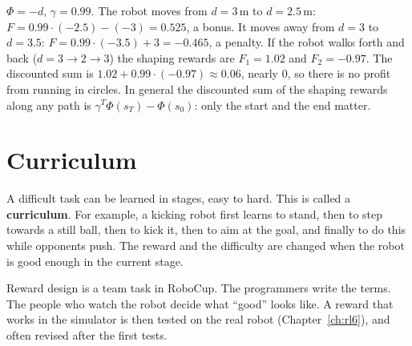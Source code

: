 \begin{example}
$\Phi=-d$, $\gamma=0.99$. The robot moves from $d=3$\,m to $d=2.5$\,m: $F=0.99\cdot(-2.5)-(-3)=0.525$, a bonus. It moves away from $d=3$ to $d=3.5$: $F=0.99\cdot(-3.5)+3=-0.465$, a penalty. If the robot walks forth and back ($d=3\to2\to3$) the shaping rewards are $F_1=1.02$ and $F_2=-0.97$. The discounted sum is $1.02+0.99\cdot(-0.97)\approx0.06$, nearly $0$, so there is no profit from running in circles. In general the discounted sum of the shaping rewards along any path is $\gamma^T\Phi(s_T)-\Phi(s_0)$: only the start and the end matter.
\end{example}

\section*{Curriculum}
A difficult task can be learned in stages, easy to hard. This is called a \textbf{curriculum}. For example, a kicking robot first learns to stand, then to step towards a still ball, then to kick it, then to aim at the goal, and finally to do this while opponents push. The reward and the difficulty are changed when the robot is good enough in the current stage.

\begin{aibox}
Reward design is a team task in RoboCup. The programmers write the terms. The people who watch the robot decide what ``good'' looks like. A reward that works in the simulator is then tested on the real robot (Chapter~\ref{ch:rl6}), and often revised after the first tests.
\end{aibox}

